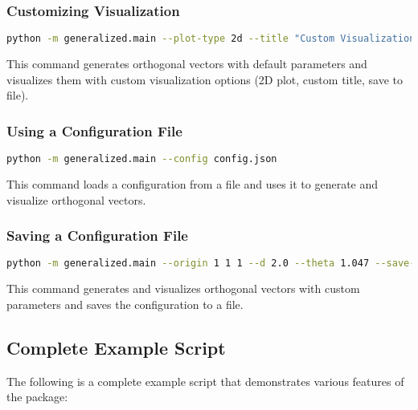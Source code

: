 \subsubsection{Customizing Visualization}

\begin{lstlisting}[language=bash]
python -m generalized.main --plot-type 2d --title "Custom Visualization" --save-path custom.png
\end{lstlisting}

This command generates orthogonal vectors with default parameters and visualizes them with custom visualization options (2D plot, custom title, save to file).

\subsubsection{Using a Configuration File}

\begin{lstlisting}[language=bash]
python -m generalized.main --config config.json
\end{lstlisting}

This command loads a configuration from a file and uses it to generate and visualize orthogonal vectors.

\subsubsection{Saving a Configuration File}

\begin{lstlisting}[language=bash]
python -m generalized.main --origin 1 1 1 --d 2.0 --theta 1.047 --save-config config.json
\end{lstlisting}

This command generates and visualizes orthogonal vectors with custom parameters and saves the configuration to a file.

\subsection{Complete Example Script}

The following is a complete example script that demonstrates various features of the package:

